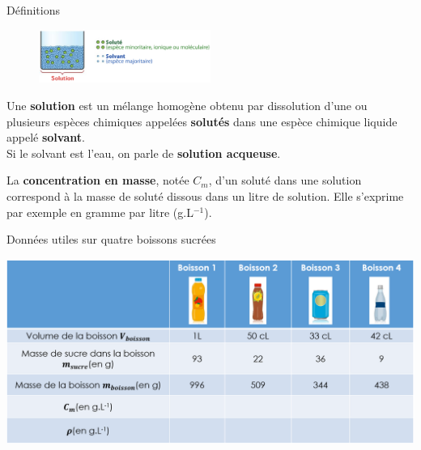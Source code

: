 
\begin{doc}{Définitions}
\begin{tcolorbox}[colback=green!5!white,colframe=green!75!black,title=\textbf{Solution, soluté et solvant}]

\begin{figure}
\vspace{-0.6cm}
    \centering
      \includegraphics[width=0.5\textwidth]{Images/Solution_solvant.png}
  \end{figure}
  Une \textbf{solution} est un mélange homogène obtenu par dissolution d’une ou plusieurs espèces chimiques appelées \textbf{solutés} dans une espèce chimique liquide appelé \textbf{solvant}.\\

  Si le solvant est l'eau, on parle de \textbf{solution acqueuse}.
\end{tcolorbox}
\begin{tcolorbox}[colback=green!5!white,colframe=green!75!black,title=\textbf{Concentration en masse}]
La \textbf{concentration en masse}, notée $C_m$,  d’un soluté dans une solution correspond à la masse de soluté dissous dans un litre de solution. Elle s’exprime par exemple en gramme par litre (g.L$^{-1}$).

\end{tcolorbox}

\end{doc}
\newpage
\begin{doc}{Données utiles sur quatre boissons sucrées}
\begin{center}
    \includegraphics[scale=0.5]{Images/Donnees.png}
\end{center}
\end{doc}

